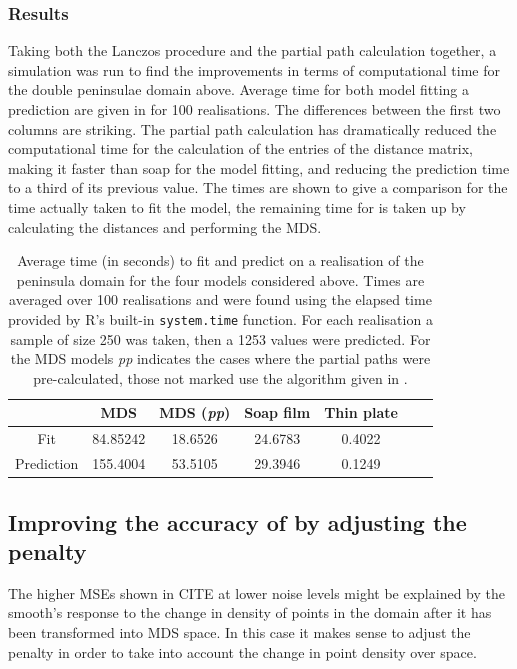 \subsubsection{Results}

Taking both the Lanczos procedure and the partial path calculation together, a simulation was run to find the improvements in terms of computational time for the double peninsulae domain above. Average time for both model fitting a prediction are given in  for 100 realisations. The differences between the first two columns are striking. The partial path calculation has dramatically reduced the computational time for the calculation of the entries of the distance matrix, making it faster than soap for the model fitting, and reducing the prediction time to a third of its previous value. The \tprs times are shown to give a comparison for the time actually taken to fit the model, the remaining time for \mdsap is taken up by calculating the distances and performing the MDS.


\begin{table}[ht]
\centering
\begin{tabular}{c || c c c c c c}
 & MDS & MDS (\textit{pp}) & Soap film & Thin plate\\ 
\hline
Fit & 84.85242 & 18.6526 & 24.6783 & 0.4022\\ 
Prediction & 155.4004 & 53.5105 & 29.3946 & 0.1249\\
\end{tabular}
\label{wt2itime}
\caption{Average time (in seconds) to fit and predict on a realisation of the peninsula domain for the four models considered above. Times are averaged over 100 realisations and were found using the elapsed time provided by \textsf{R}'s built-in \texttt{system.time} function. For each realisation a sample of size 250 was taken, then a 1253 values were predicted. For the MDS models \textit{pp} indicates the cases where the partial paths were pre-calculated, those not marked use the algorithm given in .}
\end{table}


\subsection{Improving the accuracy of \mdsap by adjusting the penalty}

The higher MSEs shown in CITE at lower noise levels might be explained by the smooth's response to the change in density of points in the domain after it has been transformed into MDS space. In this case it makes sense to adjust the penalty in order to take into account the change in point density over space.

